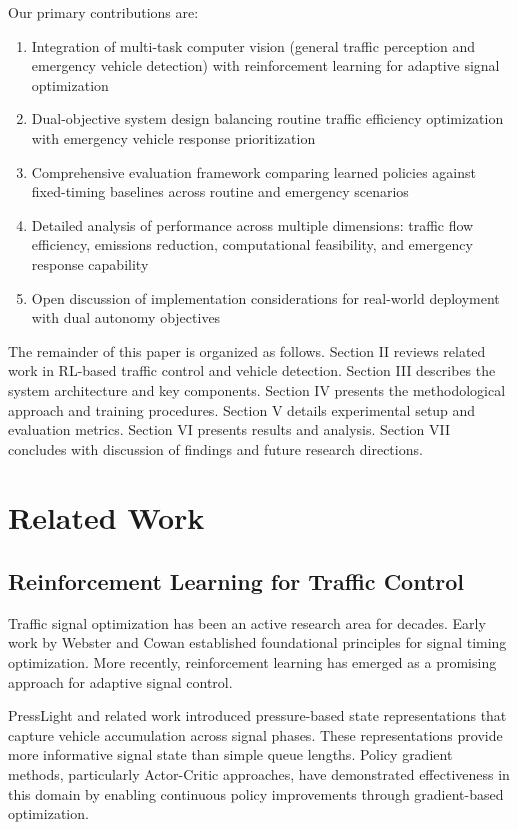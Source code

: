 \documentclass[10pt,conference]{IEEEtran}
\begin{document}
Our primary contributions are:
\begin{enumerate}
    \item Integration of multi-task computer vision (general traffic perception and emergency vehicle detection) with reinforcement learning for adaptive signal optimization
    \item Dual-objective system design balancing routine traffic efficiency optimization with emergency vehicle response prioritization
    \item Comprehensive evaluation framework comparing learned policies against fixed-timing baselines across routine and emergency scenarios
    \item Detailed analysis of performance across multiple dimensions: traffic flow efficiency, emissions reduction, computational feasibility, and emergency response capability
    \item Open discussion of implementation considerations for real-world deployment with dual autonomy objectives
\end{enumerate}

The remainder of this paper is organized as follows. Section II reviews related work in RL-based traffic control and vehicle detection. Section III describes the system architecture and key components. Section IV presents the methodological approach and training procedures. Section V details experimental setup and evaluation metrics. Section VI presents results and analysis. Section VII concludes with discussion of findings and future research directions.

\section{Related Work}

\subsection{Reinforcement Learning for Traffic Control}

Traffic signal optimization has been an active research area for decades. Early work by Webster and Cowan established foundational principles for signal timing optimization. More recently, reinforcement learning has emerged as a promising approach for adaptive signal control.

PressLight and related work introduced pressure-based state representations that capture vehicle accumulation across signal phases. These representations provide more informative signal state than simple queue lengths. Policy gradient methods, particularly Actor-Critic approaches, have demonstrated effectiveness in this domain by enabling continuous policy improvements through gradient-based optimization.
\end{document}
